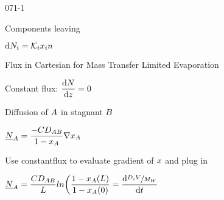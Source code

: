 \begin{mitframe}{071-1}
\begin{listone}
\begin{listtwo}
        	\item Components leaving
            	\begin{listthree}
                	\item $\mathrm{d}\nummoles_{\state}=\partcoeff\specfrac{i}{n}$
                \end{listthree}
        \end{listtwo}
\item Flux in Cartesian for Mass Transfer Limited Evaporation
	\begin{listtwo}
    	\item Constant flux: $\dfrac{\mathrm{d}\nummoles}{\mathrm{d}z}=0$
        \item Diffusion of $\helmholtz$ in stagnant $\exergy$
        	\begin{listthree}
            \item $\uline{\nummoles}_{\helmholtz}=\dfrac{-\conc\elecdisplace_{\helmholtz\exergy}}{1-\specfrac{A}}\nabla\specfrac{A}$
            	\begin{listfour}
                	\item Use constantflux to evaluate gradient of $\disp$ and plug in
                    \item $\uline{\nummoles}_{\helmholtz}=\dfrac{\conc\elecdisplace_{\helmholtz\exergy}}{\length}ln\bigg(\dfrac{1-\specfrac{A}(\length)}{1-\specfrac{A}(0)}=\dfrac{\mathrm{d}\sfrac{\pdiff\vol}{\mw}}{\mathrm{d}t}$
                \end{listfour}
            \end{listthree}
    \end{listtwo}
\end{listone}    
\end{mitframe}